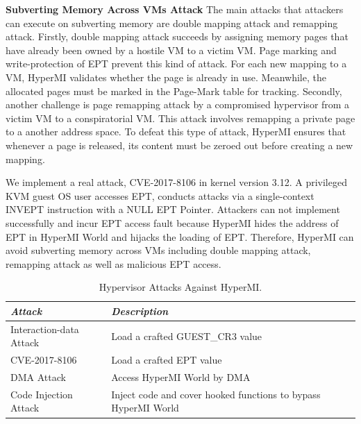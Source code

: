 \documentclass[conference]{IEEEtran}
\begin{document}
\textbf{Subverting Memory Across VMs Attack}
%
The main attacks that attackers can execute on subverting memory are double mapping attack and remapping attack.
Firstly, double mapping attack succeeds by assigning memory pages that have already been owned by a hostile VM to a victim VM. Page marking and write-protection of EPT prevent this kind of attack. For each new mapping to a VM, HyperMI validates whether the page is already in use. Meanwhile, the allocated pages must be marked in the Page-Mark table for tracking. Secondly, another challenge is page remapping attack by a compromised hypervisor from a victim VM to a conspiratorial VM. This attack involves remapping a private page to a another address space. To defeat this type of attack, HyperMI ensures that whenever a page is released, its content must be zeroed out before creating a new mapping.


We implement a real attack, CVE-2017-8106 in kernel version 3.12. A privileged KVM guest OS user accesses EPT, conducts attacks via a single-context INVEPT instruction with a NULL EPT Pointer. Attackers can not implement successfully and incur EPT access fault because HyperMI hides the address of EPT in HyperMI World and hijacks the loading of EPT. Therefore, HyperMI can avoid subverting memory across VMs including double mapping attack, remapping attack as well as malicious EPT access.


\begin{table}
\centering
\caption{Hypervisor Attacks Against HyperMI.}\label{tab3}
\begin{tabular}{p{2.8cm}|p{5.5cm}}
\hline
{\itshape\bfseries Attack} & {\itshape\bfseries Description} \\
\hline
Interaction-data Attack & Load a crafted GUEST\_CR3 value\\
\hline
CVE-2017-8106 & Load a crafted EPT value \\
\hline
DMA Attack & Access HyperMI World by DMA \\
\hline
Code Injection Attack & Inject code and cover hooked functions to bypass HyperMI World \\
\hline
\end{tabular}
\end{table}
\end{document}
